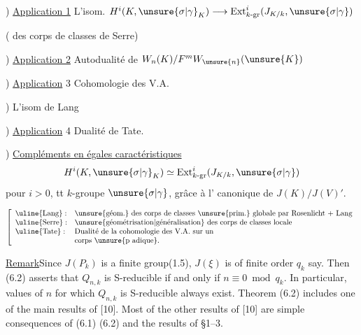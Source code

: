 ) \uline{Application 1} L'isom.
$H^i(K,\unsure{\sigma|\gamma}_K)\longrightarrow\operatorname{Ext}^i_{k\text{-gr}}(J_{K/k},\unsure{\sigma|\gamma})$


( des corps de classes de Serre)

) \uline{Application 2} Autodualité de
$W_n(K)/F^mW_{\unsure{n}}(\unsure{K})$

) \uline{Application} 3 Cohomologie des V.A.

) L'isom de Lang 

) \uline{Application} 4 Dualité de Tate.

) \uline{Compléments en égales caractéristiques}
\[
H^i(K,\unsure{\sigma|\gamma}_K)\simeq\operatorname{Ext}^i_{k\text{-gr}}(J_{K/k},\unsure{\sigma|\gamma})
\]
pour $i>0$, tt $k$-groupe $\unsure{\sigma|\gamma}$, grâce à l'
canonique de $J(K)/J(V)'$.

\[
\left[\begin{array}{ll}
\uline{\text{Lang}}:&\text{\unsure{géom.} des corps de classes \unsure{prim.} globale par Rosenlicht + Lang}\\
\uline{\text{Serre}}:&\text{\unsure{géométrisation|généralisation} des corps de classes locale}\\
\uline{\text{Tate}}:&\text{Dualité de la cohomologie des V.A. sur un}\\
&\text{corps \unsure{p adique}.}
\end{array}\right.
\]

\uline{Remark}\quad Since $J(P_k)$ is a finite group(1.5), $J(\xi)$ is of
finite order $q_k$ say. Then (6.2) asserts that $Q_{n,k}$ is S-reducible
if and only if $n\equiv0\bmod q_k$. In particular, values of $n$ for
which $Q_{n,k}$ is S-reducible always exist. Theorem (6.2) includes one
of the main results of [10]. Most of the other results of [10] are
simple consequences of (6.1) (6.2) and the results of \S1--3.

